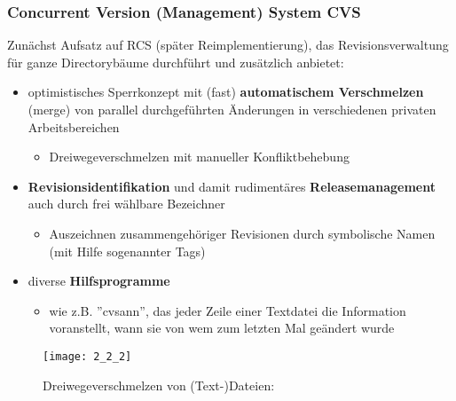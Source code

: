 \subsubsection{Concurrent Version (Management) System CVS}
Zunächst Aufsatz auf RCS (später Reimplementierung), das Revisionsverwaltung für ganze Directorybäume durchführt und zusätzlich anbietet:
\begin{itemize}
	\item optimistisches Sperrkonzept mit (fast) \textbf{automatischem Verschmelzen} (merge) von parallel durchgeführten Änderungen in verschiedenen privaten Arbeitsbereichen
	\begin{itemize}
		\item Dreiwegeverschmelzen mit manueller Konfliktbehebung
	\end{itemize}
	\item \textbf{Revisionsidentifikation} und damit rudimentäres \textbf{Releasemanagement} auch durch frei wählbare Bezeichner
	\begin{itemize}
		\item Auszeichnen zusammengehöriger Revisionen durch symbolische Namen (mit Hilfe sogenannter Tags)
	\end{itemize}
	\item diverse \textbf{Hilfsprogramme} 
	\begin{itemize}
		\item wie z.B. ''cvsann'', das jeder Zeile einer Textdatei die Information voranstellt, wann sie von wem zum letzten Mal geändert wurde
	\end{itemize}
\end{itemize}
\begin{figure}
	\caption{Dreiwegeverschmelzen von (Text-)Dateien: }
	\centering
	\texttt{[image: 2\_2\_2]}
\end{figure}
